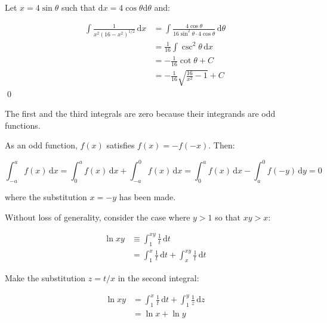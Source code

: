 \documentclass[12pt]{article}
\begin{document}
Let $x = 4\sin{\theta}$ such that $\mathrm{d}x = 4\cos{\theta} \mathrm{d}\theta$ and:

\begin{equation}
    \begin{split}
        \int \frac{1}{x^{2}(16 - x^{2})^{1/2}} \, \mathrm{d}x &= \int \frac{4\cos{\theta}}{16\sin^{2}{\theta} \cdot 4\cos{\theta}} \, \mathrm{d}\theta \\
        &= \frac{1}{16} \int \csc^{2}{\theta} \, \mathrm{d}x \\
        &= -\frac{1}{16} \cot{\theta} + C \\
        &= -\frac{1}{16} \sqrt{\frac{16}{x^{2}} - 1} + C
    \end{split}
\end{equation}
\qed


The first and the third integrals are zero because their integrands are odd functions.

As an odd function, $f(x)$ satisfies $f(x) = -f(-x)$. Then:

\begin{equation}
    \int_{-a}^{a} f(x) \, \mathrm{d}x = \int_{0}^{a} f(x) \, \mathrm{d}x + \int_{-a}^{0} f(x) \, \mathrm{d}x = \int_{0}^{a} f(x) \, \mathrm{d}x - \int_{a}^{0} f(-y) \, \mathrm{d}y = 0
\end{equation}

where the substitution $x = -y$ has been made.

Without loss of generality, consider the case where $y > 1$ so that $xy > x$:

\begin{equation}
    \begin{split}
        \ln{xy} &\equiv \int_{1}^{xy} \frac{1}{t} \, \mathrm{d}t \\
        &= \int_{1}^{x} \frac{1}{t} \, \mathrm{d}t + \int_{x}^{xy} \frac{1}{t} \, \mathrm{d}t
    \end{split}
\end{equation}

Make the substitution $z = t/x$ in the second integral:

\begin{equation}
    \begin{split}
        \ln{xy} &= \int_{1}^{x} \frac{1}{t} \, \mathrm{d}t + \int_{1}^{y} \frac{1}{z} \, \mathrm{d}z \\
        &= \ln{x} + \ln{y}
    \end{split}
\end{equation}
\end{document}
